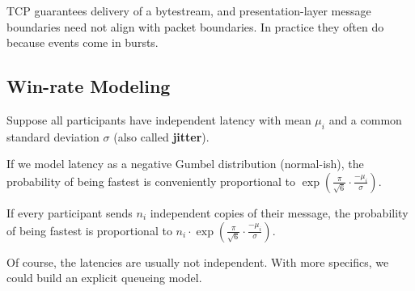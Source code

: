 \documentclass{article}
\begin{document}
TCP guarantees delivery of a bytestream, and presentation-layer message boundaries need not align with packet boundaries. In practice they often do because events come in bursts.

\subsection{Win-rate Modeling}
Suppose all participants have independent latency with mean $\mu_i$ and a common standard deviation $\sigma$ (also called \textbf{jitter}).

If we model latency as a negative Gumbel distribution (normal-ish), the probability of being fastest is conveniently proportional to $\exp\left(\frac{\pi}{\sqrt{6}} \cdot \frac{-\mu_i}{\sigma}\right)$.

If every participant sends $n_i$ independent copies of their message, the probability of being fastest is proportional to $n_i \cdot \exp\left(\frac{\pi}{\sqrt{6}} \cdot \frac{-\mu_i}{\sigma}\right)$.

Of course, the latencies are usually not independent. With more specifics, we could build an explicit queueing model.
\begin{center}
\end{center}
\end{document}
